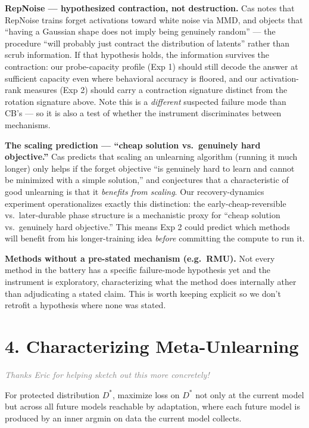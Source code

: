 \documentclass[11pt]{article}
\newcommand{\metanote}[1]{\par\noindent\textcolor{gray}{\textit{#1}}\par}
\begin{document}
\textbf{RepNoise --- hypothesized contraction, not destruction.}
Cas notes that RepNoise trains forget activations toward white noise via MMD,
and objects that ``having a Gaussian shape does not imply being genuinely
random'' --- the procedure ``will probably just contract the distribution of
latents'' rather than scrub information. If that hypothesis holds, the
information survives the contraction: our probe-capacity profile (Exp 1) should
still decode the answer at sufficient capacity even where behavioral accuracy is
floored, and our activation-rank measures (Exp 2) should carry a contraction
signature distinct from the rotation signature above. Note this is a
\emph{different} suspected failure mode than CB's --- so it is also a test of
whether the instrument discriminates between mechanisms.

\textbf{The scaling prediction --- ``cheap solution vs.\ genuinely hard
objective.''} Cas predicts that scaling an unlearning algorithm (running it
much longer) only helps if the forget objective ``is genuinely hard to learn and
cannot be minimized with a simple solution,'' and conjectures that a
characteristic of good unlearning is that it \emph{benefits from scaling}. Our
recovery-dynamics experiment operationalizes exactly this distinction: the
early-cheap-reversible vs.\ later-durable phase structure is a mechanistic proxy
for ``cheap solution vs.\ genuinely hard objective.'' This means Exp 2 could
predict which methods will benefit from his longer-training idea \emph{before}
committing the compute to run it.

\textbf{Methods without a pre-stated mechanism (e.g.\ RMU).} Not every method in
the battery has a specific failure-mode hypothesis yet and
the instrument is exploratory, characterizing what the method does internally
ather than adjudicating a stated claim. This is worth keeping explicit so we
don't retrofit a hypothesis where none was stated.

\section*{4. Characterizing Meta-Unlearning}

\metanote{Thanks Eric for helping sketch out this more concretely!}

For protected distribution $D^*$, maximize loss on $D^*$ not only at the current
model but across all future models reachable by adaptation, where each future
model is produced by an inner argmin on data the current model collects.
\end{document}
